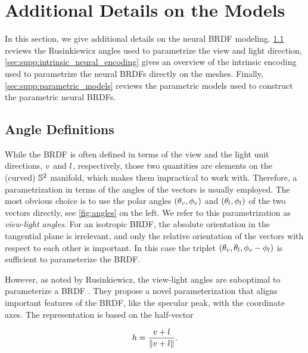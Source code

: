 \section{Additional Details on the Models}
\label{sec:supp:add_details_models}

In this section, we give additional details on the neural BRDF modeling. \cref{sec:supp:angle_definitions} reviews the Rusinkiewicz angles used to parametrize the view and light direction, \cref{sec:supp:intrinsic_neural_encoding} gives an overview of the intrinsic encoding used to parametrize the neural BRDFs directly on the meshes. Finally, \cref{sec:supp:parametric_models} reviews the parametric models used to construct the parametric neural BRDFs.


\subsection{Angle Definitions}
\label{sec:supp:angle_definitions}



While the BRDF is often defined in terms of the view and the light unit directions, $v$ and $l$, respectively, those two quantities are elements on the (curved) $\mathbb{S}^2$ manifold, which makes them impractical to work with. Therefore, a parametrization in terms of the angles of the vectors is usually employed. The most obvious choice is to use the polar angles $(\theta_v, \phi_v)$ and $(\theta_l, \phi_l)$ of the two vectors directly, see \cref{fig:angles} on the left. We refer to this parametrization as \emph{view-light angles}. For an isotropic BRDF, the absolute orientation in the tangential plane is irrelevant, and only the relative orientation of the vectors with respect to each other is important. In this case the triplet $(\theta_v, \theta_l, \phi_v - \phi_l)$ is sufficient to parameterize the BRDF.

However, as noted by Rusinkiewicz, the view-light angles are suboptimal to parameterize a BRDF \cite{rusinkiewicz1998new}. They propose a novel parameterization that aligns important features of the BRDF, like the specular peak, with the coordinate axes. The representation is based on the half-vector

\begin{equation}\label{eq:half_angle}
    h = \frac{v + l}{\|v + l\|}.
\end{equation}


